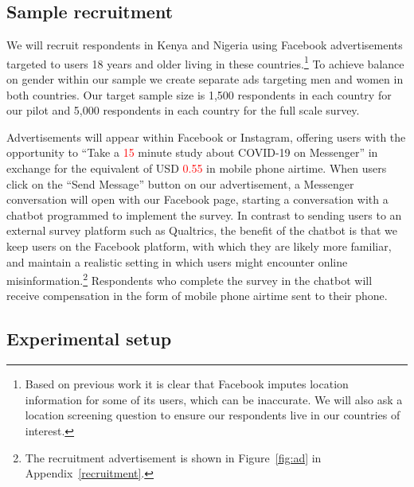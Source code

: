 \documentclass[letterpaper, 12pt, parskip=full,DIV=12]{scrartcl}
\begin{document}
\subsection{Sample recruitment}
We will recruit respondents in Kenya and Nigeria using Facebook advertisements targeted to users 18 years and older living in these countries.\footnote{Based on previous work it is clear that Facebook imputes location information for some of its users, which can be inaccurate. We will also ask a location screening question to ensure our respondents live in our countries of interest.} To achieve balance on gender within our sample we create separate ads targeting men and women in both countries. Our target sample size is 1,500 respondents in each country for our pilot and 5,000 respondents in each country for the full scale survey.



Advertisements will appear within Facebook or Instagram, offering users with the opportunity to ``Take a \textcolor{red}{15} minute study about COVID-19 on Messenger'' in exchange for the equivalent of USD \textcolor{red}{0.55} in mobile phone airtime. When users click on the ``Send Message'' button on our advertisement, a Messenger conversation will open with our Facebook page, starting a conversation with a chatbot programmed to implement the survey. In contrast to sending users to an external survey platform such as Qualtrics, the benefit of the chatbot is that we keep users on the Facebook platform, with which they are likely more familiar, and maintain a realistic setting in which users might encounter online misinformation.\footnote{The recruitment advertisement is shown in Figure~\ref{fig:ad} in Appendix~\ref{recruitment}. \color{red}{[[Add images of chatbot once linked to page]]}} Respondents who complete the survey in the chatbot will receive compensation in the form of mobile phone airtime sent to their phone. %

\subsection{Experimental setup}
\end{document}
